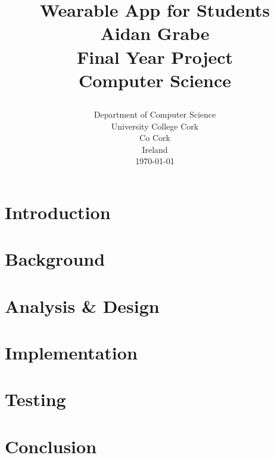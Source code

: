 \documentclass[12pt]{report}
\title{
    {\huge Wearable App for Students}\\
    {\textbf{Aidan Grabe}}\\
    {\vspace{12px}}
    {Final Year Project}\\
    {Computer Science}\\
    {\vspace{12px}}
    {\begin{figure}}
        \texttt{[image: ucc\_logo.jpg]}
    {\end{figure}}
}
\author {}
\date {
    {Department of Computer Science}\\
    {University College Cork}\\
    {Co Cork}\\
    {Ireland}\\
    {\today}
}
\begin{document}
\maketitle




\tableofcontents

\chapter{Introduction}


\chapter{Background}


\chapter{Analysis \& Design}


\chapter{Implementation}


\chapter{Testing}


\chapter{Conclusion}

\end{document}
